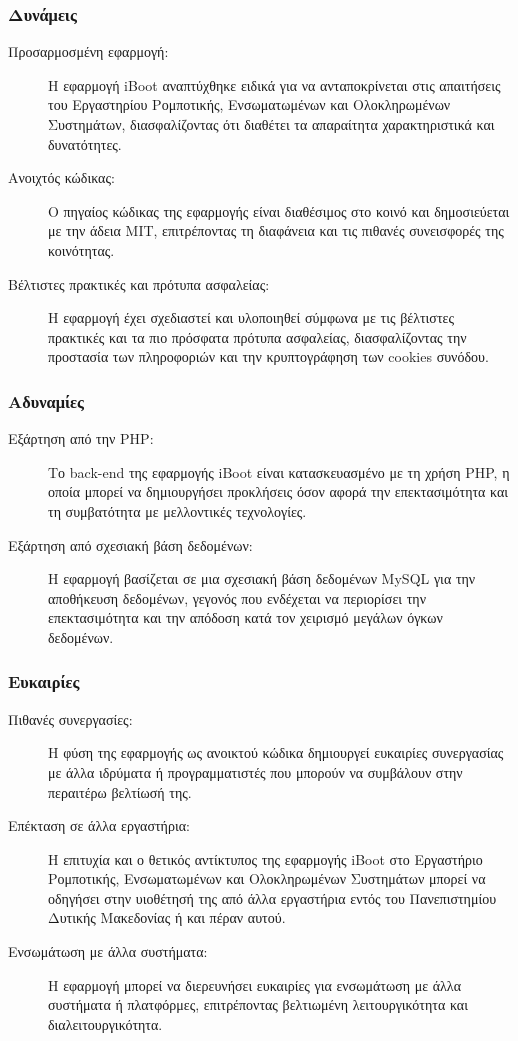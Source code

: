 \subsubsection{Δυνάμεις}
\begin{description}
	\item[Προσαρμοσμένη εφαρμογή:] Η εφαρμογή iBoot αναπτύχθηκε ειδικά για να ανταποκρίνεται στις απαιτήσεις του Εργαστηρίου Ρομποτικής, Ενσωματωμένων και Ολοκληρωμένων Συστημάτων, διασφαλίζοντας ότι διαθέτει τα απαραίτητα χαρακτηριστικά και δυνατότητες.
	\item[Ανοιχτός κώδικας:] Ο πηγαίος κώδικας της εφαρμογής είναι διαθέσιμος στο κοινό και δημοσιεύεται με την άδεια MIT, επιτρέποντας τη διαφάνεια και τις πιθανές συνεισφορές της κοινότητας.
	\item[Βέλτιστες πρακτικές και πρότυπα ασφαλείας:] Η εφαρμογή έχει σχεδιαστεί και υλοποιηθεί σύμφωνα με τις βέλτιστες πρακτικές και τα πιο πρόσφατα πρότυπα ασφαλείας, διασφαλίζοντας την προστασία των πληροφοριών και την κρυπτογράφηση των cookies συνόδου.
\end{description}

\subsubsection{Αδυναμίες}
\begin{description}
	\item[Εξάρτηση από την PHP:] Το back-end της εφαρμογής iBoot είναι κατασκευασμένο με τη χρήση PHP, η οποία μπορεί να δημιουργήσει προκλήσεις όσον αφορά την επεκτασιμότητα και τη συμβατότητα με μελλοντικές τεχνολογίες.
	\item[Εξάρτηση από σχεσιακή βάση δεδομένων:] Η εφαρμογή βασίζεται σε μια σχεσιακή βάση δεδομένων MySQL για την αποθήκευση δεδομένων, γεγονός που ενδέχεται να περιορίσει την επεκτασιμότητα και την απόδοση κατά τον χειρισμό μεγάλων όγκων δεδομένων.
\end{description}

\subsubsection{Ευκαιρίες}
\begin{description}
	\item[Πιθανές συνεργασίες:] Η φύση της εφαρμογής ως ανοικτού κώδικα δημιουργεί ευκαιρίες συνεργασίας με άλλα ιδρύματα ή προγραμματιστές που μπορούν να συμβάλουν στην περαιτέρω βελτίωσή της.
	\item[Επέκταση σε άλλα εργαστήρια:] Η επιτυχία και ο θετικός αντίκτυπος της εφαρμογής iBoot στο Εργαστήριο Ρομποτικής, Ενσωματωμένων και Ολοκληρωμένων Συστημάτων μπορεί να οδηγήσει στην υιοθέτησή της από άλλα εργαστήρια εντός του Πανεπιστημίου Δυτικής Μακεδονίας ή και πέραν αυτού.
	\item[Ενσωμάτωση με άλλα συστήματα:] Η εφαρμογή μπορεί να διερευνήσει ευκαιρίες για ενσωμάτωση με άλλα συστήματα ή πλατφόρμες, επιτρέποντας βελτιωμένη λειτουργικότητα και διαλειτουργικότητα.
\end{description}


